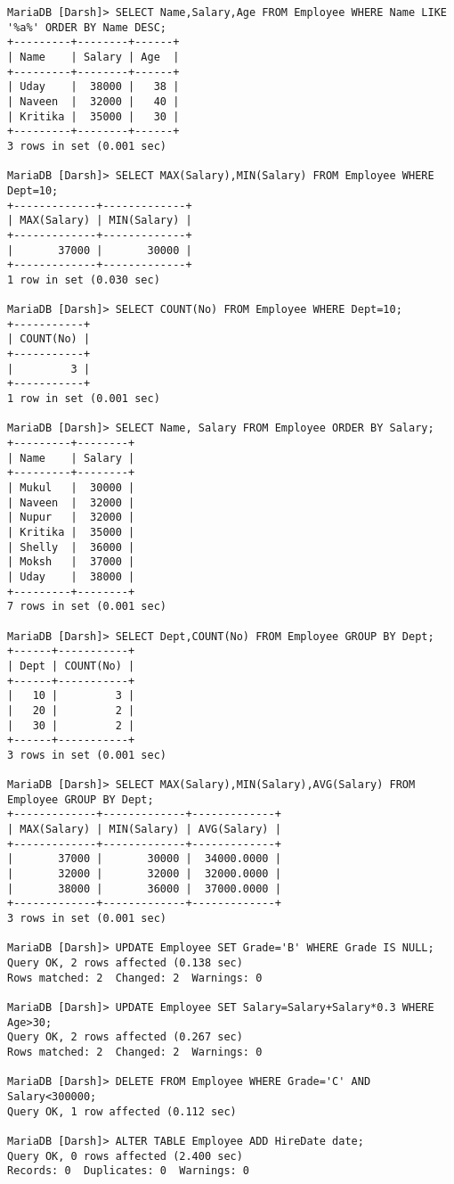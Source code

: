 \documentclass[
a4paper]{article}
\begin{document}
\begin{lstlisting}
MariaDB [Darsh]> SELECT Name,Salary,Age FROM Employee WHERE Name LIKE '%a%' ORDER BY Name DESC;
+---------+--------+------+
| Name    | Salary | Age  |
+---------+--------+------+
| Uday    |  38000 |   38 |
| Naveen  |  32000 |   40 |
| Kritika |  35000 |   30 |
+---------+--------+------+
3 rows in set (0.001 sec)

MariaDB [Darsh]> SELECT MAX(Salary),MIN(Salary) FROM Employee WHERE Dept=10;
+-------------+-------------+
| MAX(Salary) | MIN(Salary) |
+-------------+-------------+
|       37000 |       30000 |
+-------------+-------------+
1 row in set (0.030 sec)

MariaDB [Darsh]> SELECT COUNT(No) FROM Employee WHERE Dept=10;
+-----------+
| COUNT(No) |
+-----------+
|         3 |
+-----------+
1 row in set (0.001 sec)

MariaDB [Darsh]> SELECT Name, Salary FROM Employee ORDER BY Salary;
+---------+--------+
| Name    | Salary |
+---------+--------+
| Mukul   |  30000 |
| Naveen  |  32000 |
| Nupur   |  32000 |
| Kritika |  35000 |
| Shelly  |  36000 |
| Moksh   |  37000 |
| Uday    |  38000 |
+---------+--------+
7 rows in set (0.001 sec)

MariaDB [Darsh]> SELECT Dept,COUNT(No) FROM Employee GROUP BY Dept;
+------+-----------+
| Dept | COUNT(No) |
+------+-----------+
|   10 |         3 |
|   20 |         2 |
|   30 |         2 |
+------+-----------+
3 rows in set (0.001 sec)

MariaDB [Darsh]> SELECT MAX(Salary),MIN(Salary),AVG(Salary) FROM Employee GROUP BY Dept;
+-------------+-------------+-------------+
| MAX(Salary) | MIN(Salary) | AVG(Salary) |
+-------------+-------------+-------------+
|       37000 |       30000 |  34000.0000 |
|       32000 |       32000 |  32000.0000 |
|       38000 |       36000 |  37000.0000 |
+-------------+-------------+-------------+
3 rows in set (0.001 sec)

MariaDB [Darsh]> UPDATE Employee SET Grade='B' WHERE Grade IS NULL;
Query OK, 2 rows affected (0.138 sec)
Rows matched: 2  Changed: 2  Warnings: 0

MariaDB [Darsh]> UPDATE Employee SET Salary=Salary+Salary*0.3 WHERE Age>30;
Query OK, 2 rows affected (0.267 sec)
Rows matched: 2  Changed: 2  Warnings: 0

MariaDB [Darsh]> DELETE FROM Employee WHERE Grade='C' AND Salary<300000;
Query OK, 1 row affected (0.112 sec)

MariaDB [Darsh]> ALTER TABLE Employee ADD HireDate date;
Query OK, 0 rows affected (2.400 sec)
Records: 0  Duplicates: 0  Warnings: 0


\end{lstlisting}
\end{document}

